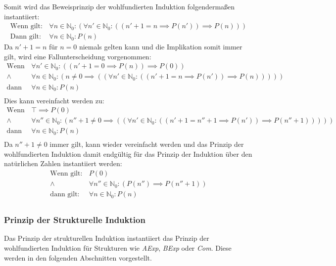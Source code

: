 				    Somit wird das Beweisprinzip der wohlfundierten Induktion folgendermaßen instantiiert:
				    \begin{align*}
					    \text{Wenn gilt:} & \,\forall n \in \mathbb{N} _ 0 : (\forall n' \in \mathbb{N} _ 0 : ((n' + 1 = n \implies P(n')) \implies P(n))) \\
					    \text{Dann gilt:} & \,\forall n \in \mathbb{N} _ 0 : P(n)
				    \end{align*}
				    Da $ n' + 1 = n $ für $ n = 0 $ niemals gelten kann und die Implikation somit immer gilt, wird eine Fallunterscheidung vorgenommen:
				    \begin{align*}
					    \text{Wenn gilt:} & \,\forall n' \in \mathbb{N} _ 0 : ((n' + 1 = 0 \implies P(n)) \implies P(0)) \\
						\land & \,\forall n \in \mathbb{N} _ 0 : (n \neq 0 \implies ((\forall n' \in \mathbb{N} _ 0 : ((n' + 1 = n \implies P(n')) \implies P(n))))) \\
						\text{dann gilt:} & \,\forall n \in \mathbb{N} _ 0 : P(n) \\
				    \end{align*}
					Dies kann vereinfacht werden zu:
					\begin{align*}
						\text{Wenn gilt:} & \,\top \implies P(0) \\
						\land & \,\forall n'' \in \mathbb{N} _ 0 : (n'' + 1 \neq 0 \implies ((\forall n' \in \mathbb{N} _ 0 : ((n' + 1 = n'' + 1 \implies P(n')) \implies P(n'' + 1))))) \\
						\text{dann gilt:} & \,\forall n \in \mathbb{N} _ 0 : P(n) \\
					\end{align*}
					Da $ n'' + 1 \neq 0 $ immer gilt, kann wieder vereinfacht werden und das Prinzip der wohlfundierten Induktion damit endgültig für das Prinzip der Induktion über den natürlichen Zahlen instantiiert werden:
					\begin{align*}
						\text{Wenn gilt:} & \,P(0) \\
						\land & \,\forall n'' \in \mathbb{N} _ 0 : (P(n'') \implies P(n'' + 1)) \\
						\text{dann gilt:} & \,\forall n \in \mathbb{N} _ 0 : P(n) \\
					\end{align*}
		    
		    \subsubsection{Prinzip der Strukturelle Induktion}
				Das Prinzip der strukturellen Induktion instantiiert das Prinzip der wohlfundierten Induktion für Strukturen wie \textit{AExp}, \textit{BExp} oder \textit{Com}. Diese werden in den folgenden Abschnitten vorgestellt.
				
